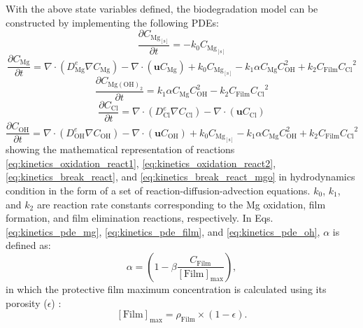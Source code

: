 With the above state variables defined, the biodegradation model can be constructed by implementing the following \gls{PDE}s:
\begin{equation} \label{eq:kinetics_pde_mg_solid}
\frac{\partial C_{\mathrm{Mg}_\mathrm{[s]}}}{\partial t}=-k_{0}C_{\mathrm{Mg}_\mathrm{[s]}}
\end{equation}
\begin{equation} \label{eq:kinetics_pde_mg}
\frac{\partial C_{\mathrm{Mg}}}{\partial t}=\nabla \cdot \left(D_{\mathrm{Mg}}^{e}  \nabla C_{\mathrm{Mg}} \right)-\nabla \cdot \left({\mathbf u} C_{\mathrm{Mg}} \right)+k_{0}C_{\mathrm{Mg}_\mathrm{[s]}}-k_{1}\alpha C_{\mathrm{Mg}}C_{\mathrm{OH}}^2 +k_{2} C_{\mathrm{Film}} {C_{\mathrm{Cl}}}^{2}
\end{equation}
\begin{equation} \label{eq:kinetics_pde_film}
\frac{\partial C_{\mathrm{Mg}(\mathrm{OH})_{2}}}{\partial t}=k_{1}\alpha C_{\mathrm{Mg}}C_{\mathrm{OH}}^2 -k_{2} C_{\mathrm{Film}} {C_{\mathrm{Cl}}}^{2}
\end{equation}
\begin{equation} \label{eq:kinetics_pde_cl}
\frac{\partial C_{\mathrm{Cl}}}{\partial t}=\nabla \cdot \left(D_{\mathrm{Cl}}^{e}  \nabla C_{\mathrm{Cl}} \right)-\nabla \cdot \left({\mathbf u} C_{\mathrm{Cl}} \right)
\end{equation}
\begin{equation} \label{eq:kinetics_pde_oh}
\frac{\partial C_{\mathrm{OH}}}{\partial t}=\nabla \cdot \left(D_{\mathrm{OH}}^{e}  \nabla C_{\mathrm{OH}} \right)-\nabla \cdot \left({\mathbf u} C_{\mathrm{OH}} \right)+k_{0}C_{\mathrm{Mg}_\mathrm{[s]}}-k_{1}\alpha C_{\mathrm{Mg}}C_{\mathrm{OH}}^2 +k_{2} C_{\mathrm{Film}} {C_{\mathrm{Cl}}}^{2}
\end{equation}
showing the mathematical representation of reactions \ref{eq:kinetics_oxidation_react1}, \ref{eq:kinetics_oxidation_react2}, \ref{eq:kinetics_break_react}, and \ref{eq:kinetics_break_react_mgo} in hydrodynamics condition in the form of a set of reaction-diffusion-advection equations. $k_0$, $k_1$, and $k_2$ are reaction rate constants corresponding to the Mg oxidation, film formation, and film elimination reactions, respectively. In Eqs. \ref{eq:kinetics_pde_mg}, \ref{eq:kinetics_pde_film}, and \ref{eq:kinetics_pde_oh}, $\alpha$ is defined as:
\begin{equation} \label{eq:kinetics_film_alpha}
\alpha=\left(1-\beta \frac{C_{\mathrm{Film}}}{[\mathrm{Film}]_{\max }}\right),
\end{equation}
in which the protective film maximum concentration is calculated using its porosity ($\epsilon$) \cite{Bajger2016}:
\begin{equation} \label{eq:kinetics_film_max}
[\mathrm{Film}]_{\max }=\rho_{\mathrm{Film}} \times(1-\epsilon).
\end{equation}

